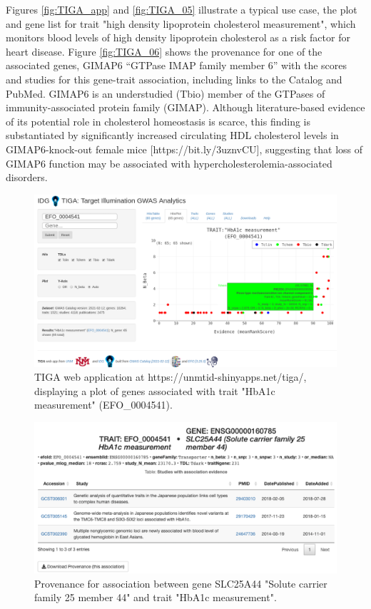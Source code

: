 Figures \ref{fig:TIGA_app} and \ref{fig:TIGA_05} illustrate a typical use case, the plot and gene list for trait "high density lipoprotein cholesterol measurement", which monitors blood levels of high density lipoprotein cholesterol as a risk factor for heart disease. Figure \ref{fig:TIGA_06} shows the provenance for one of the associated genes, GIMAP6 “GTPase IMAP family member 6” with the scores and studies for this gene-trait association, including links to the Catalog and PubMed. GIMAP6 is an understudied (Tbio) member of the GTPases of immunity-associated protein family (GIMAP). Although literature-based evidence of its potential role in cholesterol homeostasis is scarce\cite{Hoffmann2018-yh,Richardson2020-re}, this finding is substantiated by significantly increased circulating HDL cholesterol levels in GIMAP6-knock-out female mice [https://bit.ly/3uznvCU], suggesting that loss of GIMAP6 function may be associated with hypercholesterolemia-associated disorders.

\begin{figure}
	\includegraphics[width=\textwidth]{figures/tiga/FIG07_ EFO_0004541_Plot.png}
	\caption{TIGA web application at https://unmtid-shinyapps.net/tiga/, displaying a plot of genes associated with trait "HbA1c measurement" (EFO\_0004541).}
	\label{fig:TIGA_07}
\end{figure}

\begin{figure}
	\includegraphics[width=\textwidth]{figures/tiga/FIG08_EFO_0004541-SLC25A44_provenance.png}
	\caption{Provenance for association between gene SLC25A44 "Solute carrier family 25 member 44" and trait "HbA1c measurement".}
	\label{fig:TIGA_08}
\end{figure}

